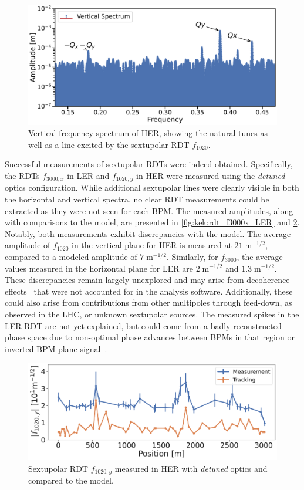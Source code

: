 \begin{figure}[!htb]
    \centering
    \includegraphics[width=0.8\linewidth]{images/kek/HER_2024-02-06_sextupoles_spectrum.pdf}
    \caption{Vertical frequency spectrum of HER, showing the natural tunes as well as a line
    excited by the sextupolar RDT $f_{1020}$.}
    \label{fig:kek:rdt_spectrum_HER}
\end{figure}

Successful measurements of sextupolar RDTs were indeed obtained. Specifically,
the RDTs $f_{3000,x}$ in LER and $f_{1020,y}$ in HER were measured using the
\textit{detuned} optics configuration. While additional sextupolar lines were clearly visible in
both the horizontal and vertical spectra, no clear RDT measurements could be extracted as they were not seen
for each BPM. The measured
amplitudes, along with comparisons to the model, are presented in \cref{fig:kek:rdt_f3000x_LER} and
\cref{fig:kek:rdt_f1020y_HER}. Notably, both measurements exhibit discrepancies with the model. 
The average amplitude of $f_{1020}$ in the vertical plane for HER is measured at $21\;\text{m}^{-1/2}$, 
compared to a modeled amplitude of $7\;\text{m}^{-1/2}$. Similarly, for $f_{3000}$, the average values 
measured in the horizontal plane for LER are $2\;\text{m}^{-1/2}$ and $1.3\;\text{m}^{-1/2}$. These
discrepancies remain largely unexplored and may arise from
decoherence effects~\cite{tomas_direct_2003} that were not accounted for in the analysis software. 
Additionally, these could also arise from contributions from other multipoles through feed-down, as
observed in the LHC, or  unknown sextupolar sources. The measured spikes in the LER RDT are not yet 
explained, but could come from a badly reconstructed phase space due to non-optimal phase advances 
between BPMs in that region or inverted BPM plane signal~\cite{frank2024private}.

\begin{figure}[!htb]
    \centering
    \includegraphics[width=0.8\linewidth]{images/kek/f1020y_HER.pdf}
    \caption{Sextupolar RDT $f_{1020,y}$ measured in HER with \textit{detuned} optics and compared to 
    the model.}
    \label{fig:kek:rdt_f1020y_HER}
\end{figure}

